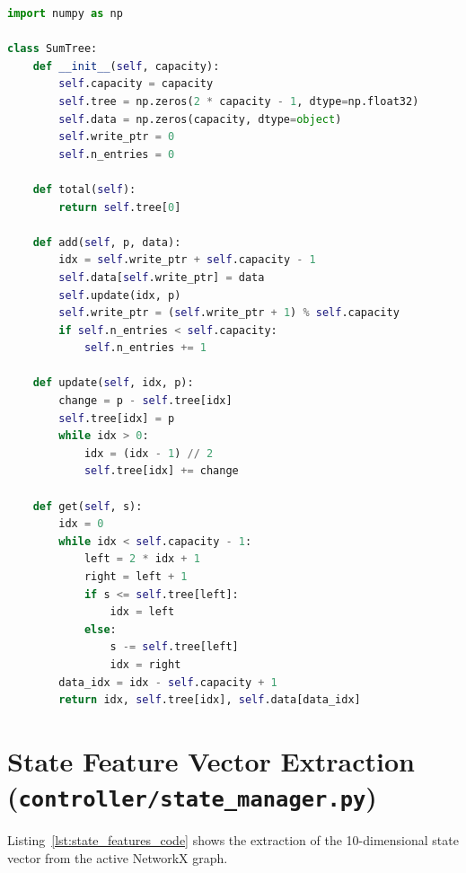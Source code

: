 \documentclass[12pt,a4paper,oneside]{report}
\begin{document}
\begin{lstlisting}[language=Python, caption={Iterative Binary SumTree and Prioritized Experience Replay}, label={lst:sumtree_code}]
import numpy as np

class SumTree:
    def __init__(self, capacity):
        self.capacity = capacity
        self.tree = np.zeros(2 * capacity - 1, dtype=np.float32)
        self.data = np.zeros(capacity, dtype=object)
        self.write_ptr = 0
        self.n_entries = 0

    def total(self):
        return self.tree[0]

    def add(self, p, data):
        idx = self.write_ptr + self.capacity - 1
        self.data[self.write_ptr] = data
        self.update(idx, p)
        self.write_ptr = (self.write_ptr + 1) % self.capacity
        if self.n_entries < self.capacity:
            self.n_entries += 1

    def update(self, idx, p):
        change = p - self.tree[idx]
        self.tree[idx] = p
        while idx > 0:
            idx = (idx - 1) // 2
            self.tree[idx] += change

    def get(self, s):
        idx = 0
        while idx < self.capacity - 1:
            left = 2 * idx + 1
            right = left + 1
            if s <= self.tree[left]:
                idx = left
            else:
                s -= self.tree[left]
                idx = right
        data_idx = idx - self.capacity + 1
        return idx, self.tree[idx], self.data[data_idx]
\end{lstlisting}

\section{State Feature Vector Extraction (\texttt{controller/state\_manager.py})}
Listing~\ref{lst:state_features_code} shows the extraction of the 10-dimensional state vector from the active NetworkX graph.
\end{document}

